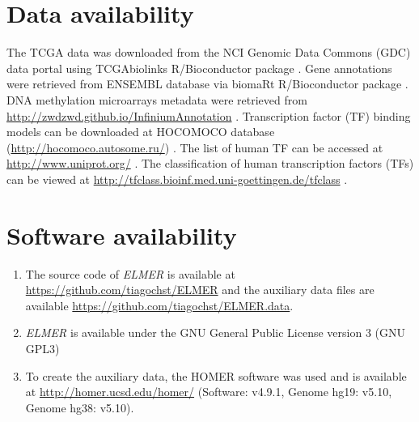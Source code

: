 \section*{Data availability} %
The TCGA data was downloaded from the NCI Genomic Data Commons (GDC) data portal \cite{grossman2016toward} using TCGAbiolinks R/Bioconductor package \cite{colaprico2015tcgabiolinks,10.12688/f1000research.8923.2}. 
Gene annotations were retrieved from ENSEMBL \cite{yates2015ensembl} database via biomaRt R/Bioconductor package \cite{durinck2005biomart,durinck2009mapping}.
DNA methylation microarrays metadata were retrieved from \url{http://zwdzwd.github.io/InfiniumAnnotation} \cite{doi:10.1093/nar/gkw967}.
Transcription factor (TF) binding models can be downloaded at HOCOMOCO database (\url{http://hocomoco.autosome.ru/}) \cite{kulakovskiy2016hocomoco}.
The list of human TF can be accessed at \url{http://www.uniprot.org/}  \cite{apweiler2004uniprot}.
The classification of human transcription factors (TFs) can be viewed at \url{http://tfclass.bioinf.med.uni-goettingen.de/tfclass}  \cite{wingender2013tfclass}.

\section*{Software availability}

\begin{enumerate}
	\item The source code of \textit{ELMER} is available at \url{https://github.com/tiagochst/ELMER} and the auxiliary data files are available 
		\url{https://github.com/tiagochst/ELMER.data}.
	\item \textit{ELMER} is available under the GNU General Public License version 3 (GNU GPL3)
    \item To create the auxiliary data, the HOMER software was used and is available at \url{http://homer.ucsd.edu/homer/} (Software: v4.9.1, Genome hg19: v5.10, Genome hg38: v5.10).
\end{enumerate}

